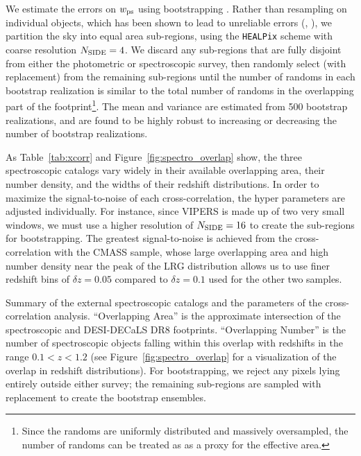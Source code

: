 We estimate the errors on $w_{\rm ps}$ using bootstrapping \citep{Efron79}. Rather than resampling on individual objects, which has been shown to lead to unreliable errors (\citealt{Mo92}, \citealt{Fisher94}), we partition the sky into equal area sub-regions, using the \texttt{HEALPix} scheme with coarse resolution $N_{\rm SIDE} = 4$. We discard any sub-regions that are fully disjoint from either the photometric or spectroscopic survey, then randomly select (with replacement) from the remaining sub-regions until the number of randoms in each bootstrap realization is similar to the total number of randoms in the overlapping part of the footprint\footnote{Since the randoms are uniformly distributed and massively oversampled, the number of randoms can be treated as as a proxy for the effective area.}. The mean and variance are estimated from 500 bootstrap realizations, and are found to be highly robust to increasing or decreasing the number of bootstrap realizations.

As Table~\ref{tab:xcorr} and Figure~\ref{fig:spectro_overlap} show, the three spectroscopic catalogs vary widely in  their available overlapping area, their number density, and the widths of their redshift distributions. In order to maximize the signal-to-noise of each cross-correlation, the hyper parameters are adjusted individually. For instance, since VIPERS is made up of two very small windows, we must use a higher resolution of $N_{\rm SIDE} = 16$ to create the sub-regions for bootstrapping. The greatest signal-to-noise is achieved from the cross-correlation with the CMASS sample, whose large overlapping area and high number density near the peak of the LRG distribution allows us to use finer redshift bins of $\delta z = 0.05$ compared to $\delta z = 0.1$ used for the other two samples. 

\begin{table}
    
    \caption{Summary of the external spectroscopic catalogs and the parameters of the cross-correlation analysis. ``Overlapping Area'' is the approximate intersection of the spectroscopic and DESI-DECaLS DR8 footprints. ``Overlapping Number'' is the number of spectroscopic objects falling within this overlap with redshifts in the range $0.1 < z < 1.2$ (see Figure~\ref{fig:spectro_overlap} for a visualization of the overlap in redshift distributions). For bootstrapping, we reject any pixels lying entirely outside either survey; the remaining sub-regions are sampled with replacement to create the bootstrap ensembles.}
    \label{tab:xcorr}
\end{table}

